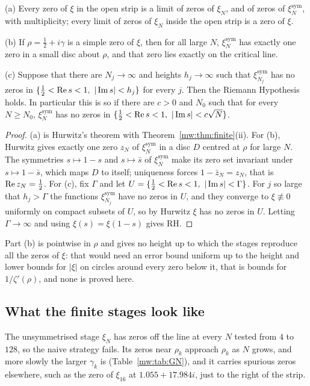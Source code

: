 \begin{corollary}[Hurwitz]\label{mw:cor:hurwitz}
(a) Every zero of $\xi$ in the open strip is a limit of zeros of $\xi_N$, and of zeros of $\xi_N^{\mathrm{sym}}$, with multiplicity; every limit of zeros of $\xi_N$ inside the open strip is a zero of $\xi$.

(b) If $\rho=\tfrac12+i\gamma$ is a simple zero of $\xi$, then for all large $N$, $\xi_N^{\mathrm{sym}}$ has exactly one zero in a small disc about $\rho$, and that zero lies exactly on the critical line.

(c) Suppose that there are $N_j\to\infty$ and heights $h_j\to\infty$ such that $\xi^{\mathrm{sym}}_{N_j}$ has no zeros in $\{\tfrac12<\re s<1,\ |\im s|<h_j\}$ for every $j$. Then the Riemann Hypothesis holds. In particular this is so if there are $c>0$ and $N_0$ such that for every $N\geq N_0$, $\xi^{\mathrm{sym}}_N$ has no zeros in $\{\tfrac12<\re s<1,\ |\im s|<c\sqrt N\}$.
\end{corollary}

\begin{proof}
(a) is Hurwitz's theorem with Theorem~\ref{mw:thm:finite}(ii). For (b), Hurwitz gives exactly one zero $z_N$ of $\xi_N^{\mathrm{sym}}$ in a disc $D$ centred at $\rho$ for large $N$. The symmetries $s\mapsto1-s$ and $s\mapsto\bar s$ of $\xi_N^{\mathrm{sym}}$ make its zero set invariant under $s\mapsto1-\bar s$, which maps $D$ to itself; uniqueness forces $1-\bar z_N=z_N$, that is $\operatorname{Re} z_N=\tfrac12$. For (c), fix $\Gamma$ and let $U=\{\tfrac12<\operatorname{Re} s<1,\ |\operatorname{Im} s|<\Gamma\}$. For $j$ so large that $h_j>\Gamma$ the functions $\xi^{\mathrm{sym}}_{N_j}$ have no zeros in $U$, and they converge to $\xi\not\equiv0$ uniformly on compact subsets of $U$, so by Hurwitz $\xi$ has no zeros in $U$. Letting $\Gamma\to\infty$ and using $\xi(s)=\xi(1-s)$ gives RH.
\end{proof}

Part (b) is pointwise in $\rho$ and gives no height up to which the stages reproduce all the zeros of $\xi$: that would need an error bound uniform up to the height and lower bounds for $|\xi|$ on circles around every zero below it, that is bounds for $1/\zeta'(\rho)$, and none is proved here.

\subsection{What the finite stages look like}

The unsymmetrised stage $\xi_N$ has zeros off the line at every $N$ tested from $4$ to $128$, so the naive strategy fails. Its zeros near $\rho_k$ approach $\rho_k$ as $N$ grows, and more slowly the larger $\gamma_k$ is (Table~\ref{mw:tab:GN}), and it carries spurious zeros elsewhere, such as the zero of $\xi_{16}$ at $1.055+17.984i$, just to the right of the strip.

